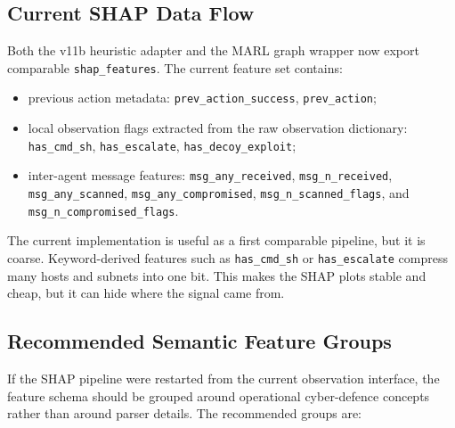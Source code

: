 \subsection{Current SHAP Data Flow}

Both the v11b heuristic adapter and the MARL graph wrapper now export comparable
\texttt{shap\_features}. The current feature set contains:

\begin{itemize}
  \item previous action metadata: \texttt{prev\_action\_success}, \texttt{prev\_action};
  \item local observation flags extracted from the raw observation dictionary:
        \texttt{has\_cmd\_sh}, \texttt{has\_escalate}, \texttt{has\_decoy\_exploit};
  \item inter-agent message features:
        \texttt{msg\_any\_received}, \texttt{msg\_n\_received},
        \texttt{msg\_any\_scanned}, \texttt{msg\_any\_compromised},
        \texttt{msg\_n\_scanned\_flags}, and
        \texttt{msg\_n\_compromised\_flags}.
\end{itemize}

The current implementation is useful as a first comparable pipeline, but it is
coarse. Keyword-derived features such as \texttt{has\_cmd\_sh} or
\texttt{has\_escalate} compress many hosts and subnets into one bit. This makes
the SHAP plots stable and cheap, but it can hide where the signal came from.

\subsection{Recommended Semantic Feature Groups}

If the SHAP pipeline were restarted from the current observation interface, the
feature schema should be grouped around operational cyber-defence concepts
rather than around parser details. The recommended groups are:

